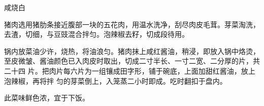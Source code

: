 \begin{recipe}{咸烧白}

\ingredients


\cooking

\step 猪肉选用猪肋条接近腹部一块的五花肉，用温水洗净，刮尽肉皮毛茸。芽菜淘洗，
去渣，切细，与豆豉混合拌匀。泡辣椒去籽，切成段待用。

\step 锅内放菜油少许，烧热，将油浪匀。猪肉抹上咸红酱油，稍浸，即放入锅中烙烫，
至皮微皱、酱油颜色已入肉皮时取出，切成二寸半长、一寸二宽、二分厚的片，共二十四
片。把肉片每六片为一组镶成田字形，铺于碗底，上面加甜红酱油，放上泡辣椒，再将拌
匀的芽菜倒上，入笼蒸二小时即成。吃时翻扣于盘内。

\notes

此菜味鲜色浓，宜于下饭。

\end{recipe}

